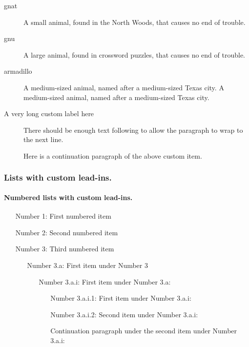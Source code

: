 \documentclass{article}
\begin{document}
\begin{description}
\item[gnat] A small animal, found in the North Woods, that causes no end of
trouble.

\item[gnu] A large animal, found in crossword puzzles, that causes no end of
trouble.

\item[armadillo] A medium-sized animal, named after a medium-sized Texas
city. A medium-sized animal, named after a medium-sized Texas city.

\item[A very long custom label here] There should be enough text following
to allow the paragraph to wrap to the next line.

Here is a continuation paragraph of the above custom item.
\end{description}

\subsubsection{Lists with custom lead-ins.}

\paragraph{Numbered lists with custom lead-ins.}

\begin{enumerate}
\item[Number 1:] First numbered item

\item[Number 2:] Second numbered item

\item[Number 3:] Third numbered item

\begin{enumerate}
\item[Number 3.a:] First item under Number 3

\begin{enumerate}
\item[Number 3.a.i:] First item under Number 3.a:

\begin{enumerate}
\item[Number 3.a.i.1:] First item under Number 3.a.i:

\item[Number 3.a.i.2:] Second item under Number 3.a.i:

Continuation paragraph under the second item under Number 3.a.i:
\end{enumerate}
\end{enumerate}
\end{enumerate}
\end{enumerate}
\end{document}
